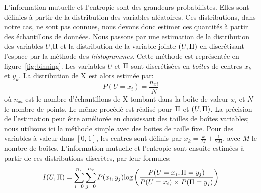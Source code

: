 L'information mutuelle et l'entropie sont des grandeurs probabilistes. Elles sont définies à partir de la distribution des variables aléatoires. Ces distributions, dans notre cas, ne sont pas connues, nous devons donc estimer ces quantités à partir des échantillons de données.
Nous passons par une estimation de la distribution des variables $U$,$\Pi$ et la distribution de la variable jointe $(U,\Pi)$ en discrétisant l'espace par la méthode des \emph{histogrammes}.
Cette méthode est représentée en figure~\ref{fig:binning}. Les variables $U$ et $\Pi$ sont discrétisées en \emph{boîtes} de centres $x_k$ et $y_k$.
La distribution de X est alors estimée par: 
$$P(U = x_i) = \frac{n_{xi}}{N} $$ où $n_{xi}$ est le nombre d'échantillons de X tombant dans la boîte de valeur $x_i$ et $N$ le nombre de points. Le même procédé est réalisé pour $\Pi$ et $(U,\Pi)$. La précision de l'estimation peut être améliorée en choisissant des tailles de boîtes variables; nous utilisons ici la méthode simple avec des boites de taille fixe. Pour des variables à valeur dans $[0,1]$, les centres sont définis par $x_k = \frac{k}{M}+\frac{1}{2M}$, avec $M$ le nombre de boîtes.
L'information mutuelle et l'entropie sont ensuite estimées à partir de ces distributions discrètes, par leur formules:
\begin{equation}
    I(U,\Pi) = \sum_{i = 0}^{n_x} \sum_{j=0}^{n_y} {P(x_i,y_j)\textrm{log}\left(\frac{P(U = x_i,\Pi = y_j)}{P(U = x_i)\times P(\Pi = y_j)}\right)}
   \end{equation}

